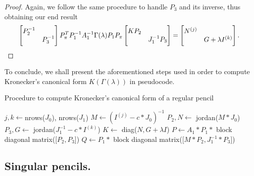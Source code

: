 \begin{proof}
    Again, we follow the same procedure to handle \(P_{3}\) and its inverse, thus obtaining our end result
    \begin{gather}
        \scalemath{0.975}{
            \begin{bmatrix}
                P_{2}^{-1} & \\
                & P_{3}^{-1}
            \end{bmatrix}
            P_{\pi}^T P_{1}^{-1} A_{1}^{-1} \Gamma(\lambda) P_{1} P_{\pi}
            \begin{bmatrix}
                KP_{2} & \\
                & J_{1}^{-1}P_{3}
            \end{bmatrix} =
            \begin{bmatrix}
                N^{(j)} & \\
                & G + \lambda I^{(k)}
            \end{bmatrix}. \label{gamma-reg}
        }
    \end{gather}
\end{proof}


To conclude, we shall present the aforementioned steps used in order to compute Kronecker's canonical form
\(K(\Gamma(\lambda))\) in pseudocode.
\pagebreak
\begin{algorithm}[!h]\label{alg:kcf-regular}
    \caption{Procedure to compute Kronecker's canonical form of a regular pencil}
    $j, k \gets $nrows($J_0$), nrows($J_1$)\;
    $M \gets (I^{(j)} - c*J_{0})^{-1}$\;
    $P_2, N \gets $ jordan($M * J_0$)\;
    $P_3, G \gets $ jordan($J_{1}^{-1} - c*I^{(k)}$)\;
    $K \gets $ diag($N, G +\lambda I$)\;
    $P \gets A_1 * P_1 * $ block diagonal matrix([$P_2, P_3$])\;
    $Q \gets P_1 * $ block diagonal matrix([$M * P_2, J_1^{-1} * P_3$])\;
    \;
\end{algorithm}
\pagebreak
\subsection*{Singular pencils.}

